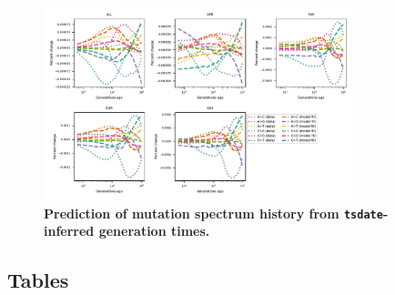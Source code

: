 \documentclass[]{article}
\begin{document}
\begin{figure}[ht!]
    \centering
    \includegraphics[width=0.8\textwidth]{../plots/goodness-of-fit.tsdate.pdf}
    \caption{
        \textbf{Prediction of mutation spectrum history from
        \texttt{tsdate}-inferred generation times.}
    }
    \label{fig:tsdate-fit}
\end{figure}


\clearpage

\subsection*{Tables}
\end{document}
